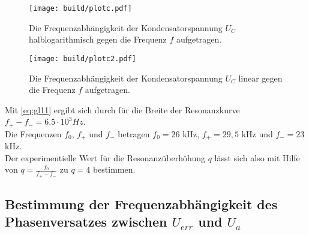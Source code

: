 
\begin{figure}
  \centering
  \texttt{[image: build/plotc.pdf]}
  \caption{Die Frequenzabhängigkeit der Kondensatorspannung $U_C$ halblogarithmisch gegen die Frequenz $f$ aufgetragen.}
  \label{fig:plotc}
\end{figure}




\begin{figure}
  \centering
  \texttt{[image: build/plotc2.pdf]}
  \caption{Die Frequenzabhängigkeit der Kondensatorspannung $U_C$ linear gegen die Frequenz $f$ aufgetragen.}
  \label{fig:plotc2}
\end{figure}

Mit \autoref{eq:gl11} ergibt sich durch für die Breite der Resonanzkurve $f_+ - f_- = 6.5 \cdot 10^3 Hz$. \\
Die Frequenzen $f_0$, $f_+$ und $f_-$ betragen $f_0 = 26$ kHz, $f_+ = 29,5$ kHz und $f_- = 23$ kHz. \\
Der experimentielle Wert für die Resonanzüberhöhung $q$ lässt sich also mit Hilfe von $q = \frac{f_0}{f_+ - f_-}$ zu $q = 4$ bestimmen. \\




\subsection{Bestimmung der Frequenzabhängigkeit des Phasenversatzes zwischen $U_{err}$ und $U_{a}$}
\label{Phasenversatz}


